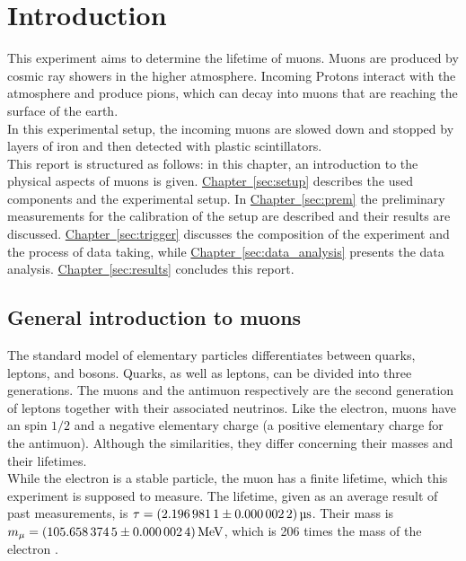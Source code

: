 \chapter{Introduction}
This experiment aims to determine the lifetime of muons. Muons are produced by cosmic ray showers in the higher atmosphere.
Incoming Protons interact with the atmosphere and produce pions, which can decay into muons that are reaching the surface of the earth. \\
In this experimental setup, the incoming muons are slowed down and stopped by layers of iron and then detected with plastic scintillators.\\
This report is structured as follows: in this chapter, an introduction to the physical aspects of muons is given.
\hyperref[sec:setup]{Chapter~\ref*{sec:setup}} describes the used components and the experimental setup. In \hyperref[sec:prem]{Chapter~\ref*{sec:prem}}
the preliminary measurements for the calibration of the setup are described and their results are discussed. \hyperref[sec:trigger]{Chapter~\ref*{sec:trigger}} discusses the composition of the experiment and the process of data taking, while \hyperref[sec:data_analysis]{Chapter~\ref*{sec:data_analysis}} presents the data analysis. \hyperref[sec:results]{Chapter~\ref*{sec:results}} concludes this report.


\newpage
\section{General introduction to muons}
The standard model of elementary particles differentiates between quarks, leptons, and bosons.
Quarks, as well as leptons, can be divided into three generations.
The muons and the antimuon respectively are the second generation of leptons together with their associated neutrinos.
Like the electron, muons have an spin $1/2$ and a negative elementary charge (a positive elementary charge for the antimuon).
Although the similarities, they differ concerning their masses and their lifetimes.\\
While the electron is a stable particle, the muon has a finite lifetime, which this experiment is supposed to measure. 
The lifetime, given as an average result of past measurements, is $\tau = \SI{2.1969811 \pm 0.0000022}{\micro\second}$.
Their mass is $m_{\mu} = \SI{105.6583745 \pm 0.0000024}{\mega\eV}$, which is 206 times the mass of the electron \cite{pdg}.


